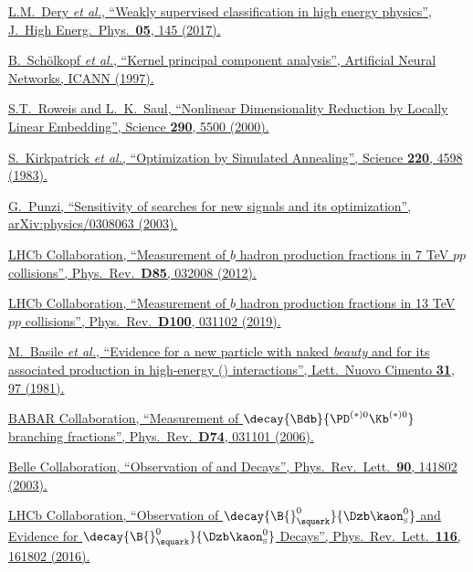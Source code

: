 \href{https://doi.org/10.1007/JHEP05(2017)145}{L.M.~Dery \textit{et al.}, \enquote{Weakly supervised classification in high energy physics}, J.\ High Energ.\ Phys.\ \textbf{05}, 145 (2017).}

\href{https://doi.org/10.1007/BFb0020217}{B.~Schölkopf \textit{et al.}, \enquote{Kernel principal component analysis}, Artificial Neural Networks, ICANN (1997).}

\href{https://doi.org/10.1126/science.290.5500.2323}{S.T.~Roweis and L.~K.~Saul, \enquote{Nonlinear Dimensionality Reduction by Locally Linear Embedding}, Science \textbf{290}, 5500 (2000).}

\href{https://doi.org/10.1126/science.220.4598.671}{S.~Kirkpatrick \textit{et al.}, \enquote{Optimization by Simulated Annealing}, Science \textbf{220}, 4598 (1983).}

\href{https://arxiv.org/abs/physics/0308063}{G.~Punzi, \enquote{Sensitivity of searches for new signals and its optimization}, arXiv:physics/0308063 (2003).}

\href{https://doi.org/10.1103/PhysRevD.85.032008}{LHCb Collaboration, \enquote{Measurement of $b$ hadron production fractions in 7 TeV $pp$ collisions}, Phys.\ Rev.\ \textbf{D85}, 032008 (2012).}

\href{https://doi.org/10.1103/PhysRevD.100.031102}{LHCb Collaboration, \enquote{Measurement of $b$ hadron production fractions in 13 TeV $pp$ collisions}, Phys.\ Rev.\ \textbf{D100}, 031102 (2019).}

\href{https://doi.org/10.1007/BF02822406}{M.~Basile \textit{et al.}, \enquote{Evidence for a new particle with naked \textit{beauty} and for its associated production in high-energy (\proton\proton) interactions}, Lett.\ Nuovo Cimento \textbf{31}, 97 (1981).}

\href{https://doi.org/10.1103/PhysRevD.74.031101}{BABAR Collaboration, \enquote{Measurement of $\decay{\Bdb}{\PD^{(*)0}\Kb^{(*)0}}$ branching fractions}, Phys.\ Rev.\ \textbf{D74}, 031101 (2006).}

\href{https://doi.org/10.1103/PhysRevLett.90.141802}{Belle Collaboration, \enquote{Observation of \decay{\Bdb}{\Dz\Kzb} and \decay{\Bdb}{\Dz\Kstarzb} Decays}, Phys.\ Rev.\ Lett.\ \textbf{90}, 141802 (2003).}

\href{https://doi.org/10.1103/PhysRevLett.116.161802}{LHCb Collaboration, \enquote{Observation of $\decay{\B{}^0_\squark}{\Dzb\kaon^0_{\mathrm{\scriptscriptstyle S}}}$ and Evidence for $\decay{\B{}^0_\squark}{\Dzb\kaon^0_{\mathrm{\scriptscriptstyle S}}}$ Decays}, Phys.\ Rev.\ Lett.\ \textbf{116}, 161802 (2016).}


